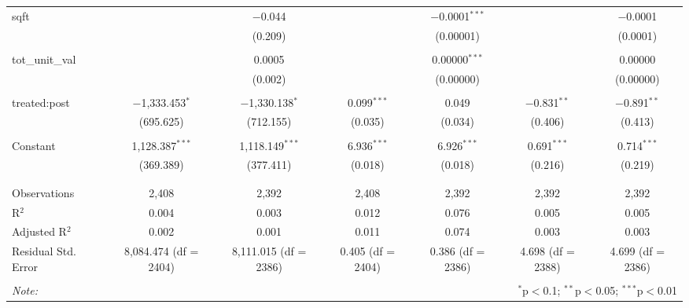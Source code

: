 \begin{table}[H]
{\begin{tabular}{@{\extracolsep{5pt}}lcccccc}
  sqft &  & $-$0.044 &  & $-$0.0001$^{***}$ &  & $-$0.0001 \\  

   &  & (0.209) &  & (0.00001) &  & (0.0001) \\  

   & & & & & & \\  

  tot\_unit\_val &  & 0.0005 &  & 0.00000$^{***}$ &  & 0.00000 \\  

   &  & (0.002) &  & (0.00000) &  & (0.00000) \\  

   & & & & & & \\  

  treated:post & $-$1,333.453$^{*}$ & $-$1,330.138$^{*}$ & 0.099$^{***}$ & 0.049 & $-$0.831$^{**}$ & $-$0.891$^{**}$ \\  

   & (695.625) & (712.155) & (0.035) & (0.034) & (0.406) & (0.413) \\  

   & & & & & & \\  

  Constant & 1,128.387$^{***}$ & 1,118.149$^{***}$ & 6.936$^{***}$ & 6.926$^{***}$ & 0.691$^{***}$ & 0.714$^{***}$ \\  

   & (369.389) & (377.411) & (0.018) & (0.018) & (0.216) & (0.219) \\  

   & & & & & & \\  

 \hline \\[-1.8ex]  

 Observations & 2,408 & 2,392 & 2,408 & 2,392 & 2,392 & 2,392 \\  

 R$^{2}$ & 0.004 & 0.003 & 0.012 & 0.076 & 0.005 & 0.005 \\  

 Adjusted R$^{2}$ & 0.002 & 0.001 & 0.011 & 0.074 & 0.003 & 0.003 \\  

 Residual Std. Error & 8,084.474 (df = 2404) & 8,111.015 (df = 2386) & 0.405 (df = 2404) & 0.386 (df = 2386) & 4.698 (df = 2388) & 4.699 (df = 2386) \\  

 \hline  

 \hline \\[-1.8ex]  

 \textit{Note:}  & \multicolumn{6}{r}{$^{*}$p$<$0.1; $^{**}$p$<$0.05; $^{***}$p$<$0.01} \\  

 \end{tabular}}  

 \end{table}  

